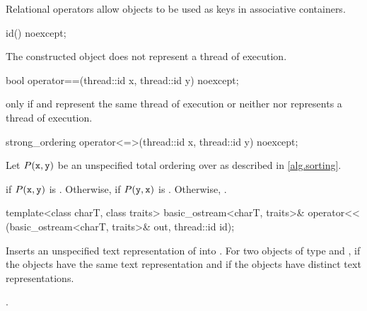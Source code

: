 \pnum
\begin{note}
Relational operators allow  objects to be used as
keys in associative containers.
\end{note}

%
\begin{itemdecl}
id() noexcept;
\end{itemdecl}

\begin{itemdescr}
\pnum
\ensures
The constructed object does not represent a thread of execution.
\end{itemdescr}

%
\begin{itemdecl}
bool operator==(thread::id x, thread::id y) noexcept;
\end{itemdecl}

\begin{itemdescr}
\pnum
\returns
{} only if  and  represent the same
thread of execution or neither  nor  represents a thread of
execution.
\end{itemdescr}

%
\begin{itemdecl}
strong_ordering operator<=>(thread::id x, thread::id y) noexcept;
\end{itemdecl}

\begin{itemdescr}
\pnum
Let $P(\texttt{x}, \texttt{y})$ be
an unspecified total ordering over 
as described in \ref{alg.sorting}.

\pnum
\returns
{} if $P(\texttt{x}, \texttt{y})$ is .
Otherwise, 
if $P(\texttt{y}, \texttt{x})$ is .
Otherwise, .
\end{itemdescr}

%
\begin{itemdecl}
template<class charT, class traits>
  basic_ostream<charT, traits>&
    operator<< (basic_ostream<charT, traits>& out, thread::id id);
\end{itemdecl}

\begin{itemdescr}
\pnum
\effects
Inserts an unspecified text representation of  into
. For two objects of type   and ,
if  the  objects have the same text
representation and if  the  objects have
distinct text representations.

\pnum
\returns
{}.
\end{itemdescr}


